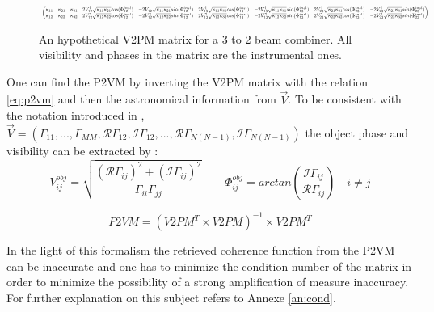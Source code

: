 \begin{figure}[h]
\begin{equation*}
\resizebox{\textwidth}{!}{
 $ \begin{pmatrix}
  \kappa_{11} & \kappa_{21} & \kappa_{31} &
  2V_{12}^{1}\sqrt{\kappa_{11}\kappa_{21}}cos(\Phi_{12}^{inst}) &
  -2V_{12}^{1}\sqrt{\kappa_{11}\kappa_{21}}sin(\Phi_{12}^{inst}) &
  2V_{13}^{1}\sqrt{\kappa_{11}\kappa_{31}}cos(\Phi_{13}^{inst}) &
 - 2V_{13}^{1}\sqrt{\kappa_{11}\kappa_{31}}sin(\Phi_{13}^{inst}) &
  2V_{23}^{1}\sqrt{\kappa_{21}\kappa_{31}}cos(\Phi_{23}^{inst}) & -2V_{23}^{1}\sqrt{\kappa_{21}\kappa_{31}}sin(\Phi_{23}^{inst})\\
  \kappa_{12} & \kappa_{22} & \kappa_{32} &
  2V_{12}^{2}\sqrt{\kappa_{12}\kappa_{22}}cos(\Phi_{12}^{inst}) &
  -2V_{12}^{2}\sqrt{\kappa_{12}\kappa_{22}}sin(\Phi_{12}^{inst}) &
  2V_{13}^{2}\sqrt{\kappa_{12}\kappa_{32}}cos(\Phi_{13}^{inst}) &
 - 2V_{13}^{2}\sqrt{\kappa_{12}\kappa_{32}}sin(\Phi_{13}^{inst}) &
  2V_{23}^{2}\sqrt{\kappa_{22}\kappa_{32}}cos(\Phi_{23}^{inst}) &   -2V_{23}^{2}\sqrt{\kappa_{22}\kappa_{32}}sin(\Phi_{23}^{inst})

\end{pmatrix}
$}
\end{equation*}
\caption{An hypothetical V2PM matrix for a 3 to 2 beam combiner. All visibility and phases in the matrix are the instrumental ones.}
\label{v2pm.expl}
\end{figure}

One can find the \gls{P2VM} by inverting the V2PM
matrix with the relation \ref{eq:p2vm} and then the astronomical
information from $\vec{V}$. To be consistent with the notation introduced in \cite{saviauk},   $\vec{V} =
(\Gamma_{11},...,\Gamma_{MM},\mathcal{R}\Gamma_{12},\mathcal{I}\Gamma_{12},...,\mathcal{R}\Gamma_{N(N-1)},\mathcal{I}\Gamma_{N(N-1)})$ the object phase and visibility can be extracted by :
\begin{equation}\label{eq:banana}
V_{ij}^{obj} = \sqrt{\frac{(\mathcal{R}\Gamma_{ij})^2+(\mathcal{I}\Gamma_{ij})^2}{\Gamma_{ii}\Gamma_{jj}}} \qquad
\Phi_{ij}^{obj} = arctan(\frac{\mathcal{I}\Gamma_{ij}}{\mathcal{R}\Gamma_{ij}}) \quad i\neq j
\end{equation}

\begin{equation}
  P2VM = (V2PM^T\times V2PM)^{-1}\times V2PM^{T} \label{eq:p2vm}
\end{equation}  

In the light of this formalism the retrieved coherence function from the \gls{P2VM} can be inaccurate and one has to minimize the condition number of the matrix in order to minimize the possibility of a strong amplification of measure inaccuracy. For further explanation on this subject refers to Annexe \ref{an:cond}.

